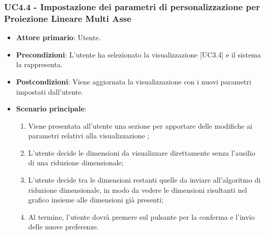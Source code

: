 \subsubsection{UC4.4 - Impostazione dei parametri di personalizzazione per Proiezione Lineare Multi Asse}
\begin{itemize}
	\item \textbf{Attore primario}: Utente.
	\item \textbf{Precondizioni}: L'utente ha selezionato la visualizzazione  [UC3.4] e il sistema la rappresenta.
	\item \textbf{Postcondizioni}: Viene aggiornata la visualizzazione  con i nuovi parametri impostati dall'utente.
	\item \textbf{Scenario principale}:
	\begin{enumerate}
			\item Viene presentata all'utente una sezione per apportare delle modifiche ai parametri relativi alla visualizzazione ;
			\item L'utente decide le dimensioni da visualizzare direttamente senza l'ausilio di una riduzione dimensionale;
			\item L'utente decide tra le dimensioni restanti quelle da inviare all'algoritmo di riduzione dimensionale, in modo da vedere le dimensioni risultanti nel grafico insieme alle dimensioni già presenti;
			\item Al termine, l'utente dovrà premere sul pulsante per la conferma e l'invio delle nuove preferenze.
		\end{enumerate}
\end{itemize}